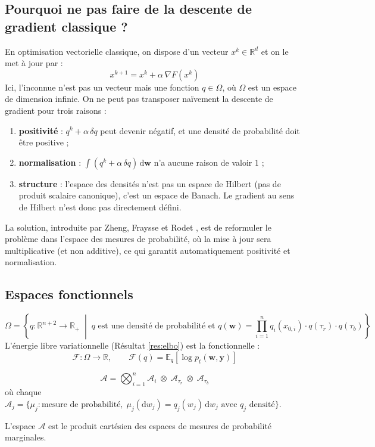 \documentclass[12pt]{article}
\newcommand{\w}{\boldsymbol{w}}
\newcommand{\y}{\boldsymbol{y}}
\begin{document}
\subsection{Pourquoi ne pas faire de la descente de gradient classique ?}

En optimisation vectorielle classique, on dispose d'un vecteur $x^k \in \mathbb{R}^d$ et on le met à jour par 
:
\[
x^{k+1} = x^k + \alpha\, \nabla F(x^k)
\]
Ici, l'inconnue n'est pas un vecteur mais une fonction $q \in \Omega$, où $\Omega$ est un espace de dimension infinie. On ne peut pas transposer naïvement la descente de gradient pour trois raisons 
:
\begin{enumerate}[label=(\roman*)]
    \item \textbf{positivité} 
: $q^k + \alpha\, \delta q$ peut devenir négatif, et une densité de probabilité doit être positive 
;
    \item \textbf{normalisation} 
: $\int (q^k + \alpha\, \delta q)\, \mathrm{d}\w$ n'a aucune raison de valoir $1$ 
;
    \item \textbf{structure} 
: l'espace des densités n'est pas un espace de Hilbert (pas de produit scalaire canonique), c'est un espace de Banach. Le gradient au sens de Hilbert n'est donc pas directement défini.
\end{enumerate}
La solution, introduite par Zheng, Fraysse et Rodet 
\cite{rodet}, est de reformuler le problème dans l'espace des mesures de probabilité, où la mise à jour sera multiplicative (et non additive), ce qui garantit automatiquement positivité et normalisation.


\subsection{Espaces fonctionnels}

\begin{definitionbox}
\label{def:omega}
\begin{equation}
    \Omega = \left\{ q : \mathbb{R}^{n+2} \to \mathbb{R}_+ \;\middle|\; q \text{ est une densité de probabilité et } q(\w) = \prod_{i=1}^n q_i(x_{0,i}) \cdot q(\tau_r) \cdot q(\tau_b) \right\}
\end{equation}
L'énergie libre variationnelle (Résultat 
\ref{res:elbo}) est la fonctionnelle 
:
\[
\mathcal{F} : \Omega \to \mathbb{R}, \qquad \mathcal{F}(q) = \mathbb{E}_q[\log p_t(\w, \y)]
\]
\end{definitionbox}

\begin{definitionbox}
\label{def:A}
\begin{equation}
    \mathcal{A} = \bigotimes_{i=1}^n \mathcal{A}_i \;\otimes\; \mathcal{A}_{\tau_r} \;\otimes\; \mathcal{A}_{\tau_b}
\end{equation}
où chaque $\mathcal{A}_j = \{\mu_j : \text{mesure de probabilité},\; \mu_j(\mathrm{d}w_j) = q_j(w_j)\,\mathrm{d}w_j \text{ avec } q_j \text{ densité}\}$.

L'espace $\mathcal{A}$ est le produit cartésien des espaces de mesures de probabilité marginales.
\end{definitionbox}
\end{document}

